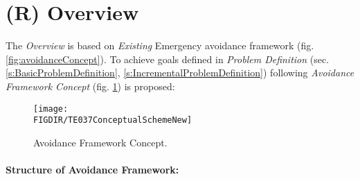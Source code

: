     
\section{(R) Overview}\label{s:approachOverview}

\noindent The \emph{Overview} is based on \emph{Existing} Emergency avoidance framework \cite{gomola2017obstacle} (fig. \ref{fig:avoidanceConcept}). To achieve goals defined in \emph{Problem Definition} (sec. \ref{s:BasicProblemDefinition}, \ref{s:IncrementalProblemDefinition}) following \emph{Avoidance Framework Concept} (fig. \ref{fig:AvoidanceFrameworkConceptNew}) is proposed:

\begin{figure}[H]
    \centering
    \texttt{[image: \\FIGDIR/TE037ConceptualSchemeNew]} 
    \caption{Avoidance Framework Concept.}
    \label{fig:AvoidanceFrameworkConceptNew}
\end{figure}


\paragraph{Structure of Avoidance Framework:}

